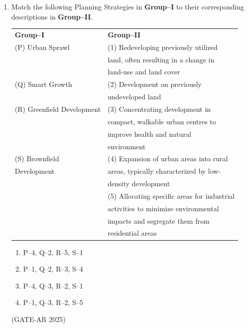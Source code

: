 \documentclass[a4paper,10pt]{article}
\begin{document}
\begin{enumerate}
\item Match the following Planning Strategies in \textbf{Group–I} to their corresponding descriptions in \textbf{Group–II}. \\
\begin{tabular}{ l l }
\textbf{Group–I} & \textbf{Group–II} \\
(P) Urban Sprawl & (1) Redeveloping previously utilized \\
& land, often resulting in a change in \\
& land-use and land cover \\
(Q) Smart Growth & (2) Development on previously \\
& undeveloped land \\
(R) Greenfield Development & (3) Concentrating development in \\
& compact, walkable urban centres to \\
& improve health and natural \\
& environment \\
(S) Brownfield & (4) Expansion of urban areas into rural \\
Development & areas, typically characterized by low- \\
& density development \\
& (5) Allocating specific areas for industrial \\
& activities to minimize environmental \\
& impacts and segregate them from \\
& residential areas \\
\end{tabular}
\begin{multicols}{2}
\begin{enumerate}
    \item P–4, Q–2, R–5, S–1
    \item P–1, Q–2, R–3, S–4
    \item P–4, Q–3, R–2, S–1
    \item P–1, Q–3, R–2, S–5
\end{enumerate}
\end{multicols}
\hfill (GATE-AR 2025)


\end{enumerate}
\end{document}
